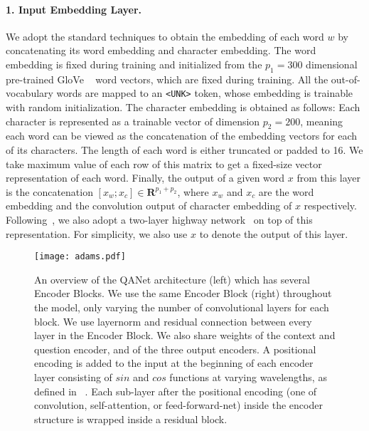 \documentclass{article} \usepackage{iclr2018_conference,times}
\begin{document}
\paragraph{1. Input Embedding Layer.} We adopt the standard techniques to obtain the embedding of each word $w$ by concatenating its word embedding and character embedding. The word embedding is fixed during training and initialized from the $p_1=300$ dimensional pre-trained GloVe ~\citep{pennington2014glove} word vectors, which are fixed during training. All the out-of-vocabulary words are mapped to an \texttt{<UNK>} token, whose embedding is trainable with random initialization. The character embedding is obtained as follows:
Each character is represented as a trainable vector of dimension $p_2=200$, meaning each word can be viewed as the concatenation of the embedding vectors for each of its characters. The length of each word is either truncated or padded to 16. We take maximum value of each row of this matrix to get a fixed-size vector representation of each word. Finally, the output of a given word $x$ from this layer is the concatenation $[x_w; x_c]\in\mathbf{R}^{p_1+p_2}$, where $x_w$ and $x_c$ are the word embedding and the convolution output of character embedding of $x$ respectively.
Following~\cite{SeoKFH16}, we also adopt a two-layer highway network~\citep{SrivastavaGS15} on top of this representation.
For simplicity, we also use $x$ to denote the output of this layer.  
\begin{figure}[t]
 \centering \texttt{[image: adams.pdf]}
\caption{An overview of the QANet architecture (left) which has several Encoder Blocks. We use the same Encoder Block (right) throughout the model, only varying the number of convolutional layers for each block. We use layernorm and residual connection between every layer in the Encoder Block. We also share weights of the context and question encoder, and of the three output encoders.  A positional encoding is added to the input at the beginning of each encoder layer consisting of $sin$ and $cos$ functions at varying wavelengths, as defined in ~\citep{VaswaniSPUJGKP17}.
 Each sub-layer after the positional encoding (one of convolution, self-attention, or feed-forward-net) inside the encoder structure is wrapped inside a residual block.}
\label{model_diagram}
\end{figure}
\end{document}
